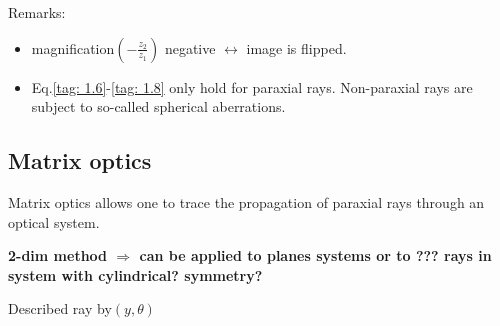         Remarks:
        \begin{itemize}
            \item magnification$\left(-\frac{z_2}{z_1}\right)$ negative $\leftrightarrow$ image is flipped.
            \item Eq.\ref{tag: 1.6}-\ref{tag: 1.8} only hold for paraxial rays. Non-paraxial rays are subject to so-called spherical aberrations.
        \end{itemize}

    \subsection{Matrix optics}
        Matrix optics allows one to trace the propagation of paraxial rays through an optical system.

        {\bf 2-dim method $\Rightarrow$ can be applied to planes systems or to ??? rays in system with cylindrical? symmetry?}










        Described ray by$(y,\theta)$
        







